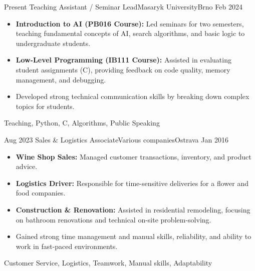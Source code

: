 %
%

\begin{experiences}
  \experience
    {Present}   {Teaching Assistant / Seminar Lead}{Masaryk University}{Brno}
    {Feb 2024} {
      \begin{itemize}
        \item \textbf{Introduction to AI (PB016 Course):} Led seminars for two semesters, teaching fundamental concepts of AI, search algorithms, and basic logic to undergraduate students.
        \item \textbf{Low-Level Programming (IB111 Course):} Assisted in evaluating student assignments (C), providing feedback on code quality, memory management, and debugging.
        \item Developed strong technical communication skills by breaking down complex topics for students.
      \end{itemize}
    }
    {Teaching, Python, C, Algorithms, Public Speaking}
  \emptySeparator

  \experience
    {Aug 2023} {Sales \& Logistics Associate}{Various companies}{Ostrava}
    {Jan 2016} {
      \begin{itemize}
        \item \textbf{Wine Shop Sales:} Managed customer transactions, inventory, and product advice.
        \item \textbf{Logistics Driver:} Responsible for time-sensitive deliveries for a flower and food companies.
        \item \textbf{Construction \& Renovation:} Assisted in residential remodeling, focusing on bathroom renovations and technical on-site problem-solving.
        \item Gained strong time management and manual skills, reliability, and ability to work in fast-paced environments.
      \end{itemize}
    }
    {Customer Service, Logistics, Teamwork, Manual skills, Adaptability}
  \emptySeparator
\end{experiences}
